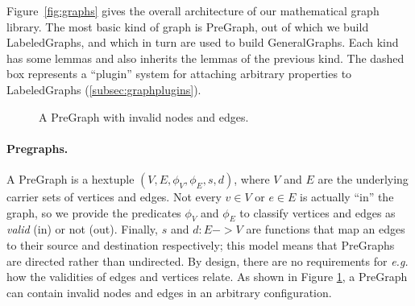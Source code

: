 Figure~\ref{fig:graphs} gives the overall architecture of our mathematical graph library. The most basic kind of graph is PreGraph, out of which we build LabeledGraphs, and which in turn are used
to build GeneralGraphs.  Each kind has some lemmas and also inherits the lemmas of the previous kind.  The dashed box represents a ``plugin'' system for attaching arbitrary properties to LabeledGraphs (\ref{subsec:graphplugins}). %

\begin{figure}[t]
\centering
{}
\endpgfgraphicnamed
\vspace{1ex}
\caption{A PreGraph with invalid nodes and edges.}\label{fig:pregraph}
\end{figure}

\vspace{-0.75ex}
\iftrue
\paragraph{Pregraphs.} A PreGraph is a hextuple $(V, E, \phi_V, \phi_E, s, d)$,
where $V$ and $E$ are the underlying carrier sets of vertices and edges.  Not every $v \in V$ or $e \in E$ is actually ``in'' the graph, so we provide the predicates $\phi_V$ and $\phi_E$ to classify vertices and edges as \emph{valid} (in) or not (out).  Finally, $s$ and $d : E -> V$ are functions that map an edges to their source and destination respectively; this model means that PreGraphs are directed rather than undirected.  By design, there are no requirements for \emph{e.g.} how the validities of edges and vertices relate.  As shown in Figure \ref{fig:pregraph}, a PreGraph can contain invalid nodes and edges in an arbitrary configuration.

